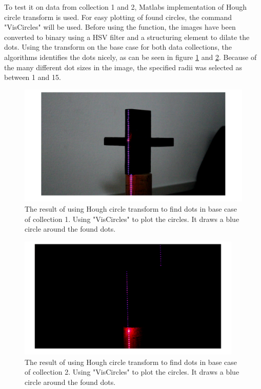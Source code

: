 To test it on data from collection 1 and 2, Matlabs implementation of Hough circle transform \cite{matlab_imfindcircles} is used. For easy plotting of found circles, the command "VisCircles" \cite{matlab_viscircles} will be used. Before using the function, the images have been converted to binary using a HSV filter and a structuring element to dilate the dots. Using the transform on the base case for both data collections, the algorithms identifies the dots nicely, as can be seen in figure \ref{fig:houghcirclebase1} and \ref{fig:houghcirclebase2}. Because of the many different dot sizes in the image, the specified radii was selected as between 1 and 15. 

\begin{figure}[h]
    \centering
    \includegraphics[width=1.0\textwidth]{figures/ImageAnalysis/HoughCircle/HoughCircles_base1.png}
    \caption{The result of using Hough circle transform to find dots in base case of collection 1. Using "VisCircles" to plot the circles. It draws a blue circle around the found dots.}
    \label{fig:houghcirclebase1}
\end{figure}
\begin{figure}[h]
    \centering
    \includegraphics[width=0.95\textwidth]{figures/ImageAnalysis/HoughCircle/HoughCircles_base2.png}
    \caption{The result of using Hough circle transform to find dots in base case of collection 2. Using "VisCircles" to plot the circles. It draws a blue circle around the found dots. }
    \label{fig:houghcirclebase2}
\end{figure}
